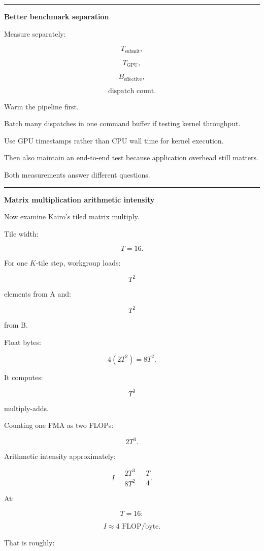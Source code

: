 \begin{center}\rule{0.5\linewidth}{0.5pt}\end{center}

\textbf{Better benchmark separation}

Measure separately:

\[
T_{\text{submit}},
\]

\[
T_{\text{GPU}},
\]

\[
B_{\text{effective}},
\]

\[
\text{dispatch count}.
\]

Warm the pipeline first.

Batch many dispatches in one command buffer if testing kernel throughput.

Use GPU timestamps rather than CPU wall time for kernel execution.

Then also maintain an end-to-end test because application overhead still matters.

Both measurements answer different questions.

\begin{center}\rule{0.5\linewidth}{0.5pt}\end{center}

\textbf{Matrix multiplication arithmetic intensity}

Now examine Kairo's tiled matrix multiply.

Tile width:

\[
T=16.
\]

For one \(K\)-tile step, workgroup loads:

\[
T^2
\]

elements from A and:

\[
T^2
\]

from B.

Float bytes:

\[
4(2T^2)
=
8T^2.
\]

It computes:

\[
T^3
\]

multiply-adds.

Counting one FMA as two FLOPs:

\[
2T^3.
\]

Arithmetic intensity approximately:

\[
\boxed{
I=
\frac{
2T^3
}{
8T^2
}
=
\frac T4.
}
\]

At:

\[
T=16:
\]

\[
\boxed{
I\approx4\text{ FLOP/byte}.
}
\]

That is roughly:

